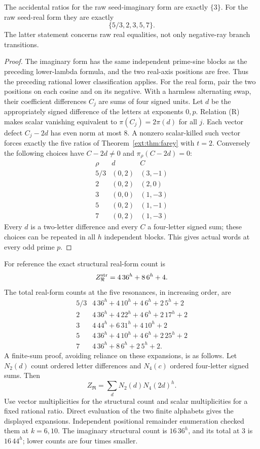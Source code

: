 \begin{theorem}\label{ext:thm:seed}
The accidental ratios for the raw seed-imaginary form are exactly $\{3\}$. For the raw seed-real form they are exactly
\[
\{5/3,2,3,5,7\}.
\]
The latter statement concerns raw real equalities, not only negative-ray branch transitions.
\end{theorem}
\begin{proof}
The imaginary form has the same independent prime-sine blocks as the preceding lower-lambda formula, and the two real-axis positions are free. Thus the preceding rational lower classification applies.
For the real form, pair the two positions on each cosine and on its negative. With a harmless alternating swap, their coefficient differences $C_j$ are sums of four signed units. Let $d$ be the appropriately signed difference of the letters at exponents $0,p$. Relation (R) makes scalar vanishing equivalent to $\pi(C_j)=2\pi(d)$ for all $j$. Each vector defect $C_j-2d$ has even norm at most $8$. A nonzero scalar-killed such vector forces exactly the five ratios of Theorem~\ref{ext:thm:farey} with $t=2$. Conversely the following choices have $C-2d\ne0$ and $\pi_\rho(C-2d)=0$:
\[
\begin{array}{c|cc}
\rho&d&C\\\hline
5/3&(0,2)&(3,-1)\\
2&(0,2)&(2,0)\\
3&(0,0)&(1,-3)\\
5&(0,2)&(1,-1)\\
7&(0,2)&(1,-3)
\end{array}
\]
Every $d$ is a two-letter difference and every $C$ a four-letter signed sum; these choices can be repeated in all $h$ independent blocks. This gives actual words at every odd prime $p$.
\end{proof}
For reference the exact structural real-form count is
\[
Z_{\Re}^{\rm str}=4\,36^h+8\,6^h+4.
\]
The total real-form counts at the five resonances, in increasing order, are
\[
\begin{array}{c|l}
5/3&4\,36^h+4\,10^h+4\,6^h+2\,5^h+2\\
2&4\,36^h+4\,22^h+4\,6^h+2\,17^h+2\\
3&4\,44^h+6\,31^h+4\,10^h+2\\
5&4\,36^h+4\,10^h+4\,6^h+2\,25^h+2\\
7&4\,36^h+8\,6^h+2\,5^h+2.
\end{array}
\]
A finite-sum proof, avoiding reliance on these expansions, is as follows. Let $N_2(d)$ count ordered letter differences and $N_4(c)$ ordered four-letter signed sums. Then
\[
Z_{\Re}=\sum_dN_2(d)N_4(2d)^h.
\]
Use vector multiplicities for the structural count and scalar multiplicities for a fixed rational ratio. Direct evaluation of the two finite alphabets gives the displayed expansions. Independent positional remainder enumeration checked them at $k=6,10$.
The imaginary structural count is $16\,36^h$, and its total at $3$ is $16\,44^h$; lower counts are four times smaller.

